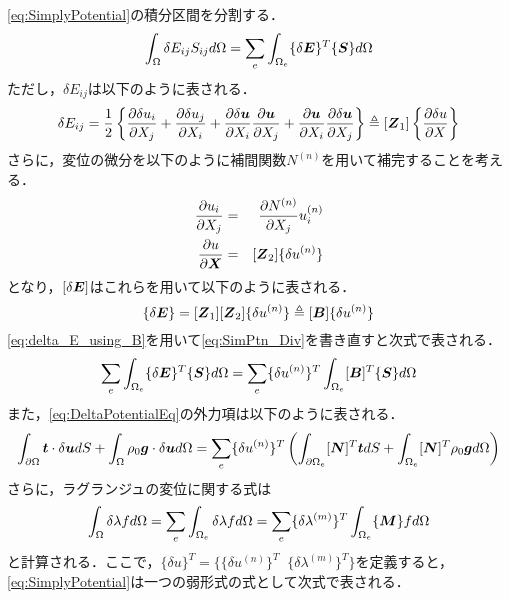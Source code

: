\eqref{eq:SimplyPotential}の積分区間を分割する．
\begin{equation}\label{eq:SimPtn_Div}
	\int_{\Omega} \delta E_{ij} S_{ij} d\Omega = \sum_{e} \int_{\Omega_e} \{\delta {\mbox{\boldmath $E$}} \}^T \{{\mbox{\boldmath $S$}} \} d\Omega 
\end{equation}
ただし，$ \delta E_{ij} $は以下のように表される．
\begin{equation}\label{eq:DeltaEeq}
	\delta E_{ij} = \frac{1}{2} \left\{ \frac{\partial \delta u_i}{\partial X_j} + \frac{\partial \delta u_j}{\partial X_i} + \frac{\partial \delta {\mbox{\boldmath $u$}}}{\partial X_i} \frac{\partial {\mbox{\boldmath $u$}}}{\partial X_j} + \frac{\partial {\mbox{\boldmath $u$}}}{\partial X_i} \frac{\partial \delta {\mbox{\boldmath $u$}}}{\partial X_j} \right\} \triangleq [{\mbox{\boldmath $Z$}}_1]\left\{ \frac{\partial \delta u}{\partial X}\right\}
\end{equation}
さらに，変位の微分を以下のように補間関数$ N^{(n)} $を用いて補完することを考える．
\begin{eqnarray}\label{eq:InterpolateU}
	\frac{\partial u_i}{\partial X_j} &=& \frac{\partial N^{(n)}}{\partial X_j} u_i^{(n)} \\
	\frac{\partial u}{\partial {\mbox{\boldmath $X$}}} &=& [{\mbox{\boldmath $Z$}}_2]\{ \delta u^{(n)} \}
\end{eqnarray}
となり，$ [\delta {\mbox{\boldmath $E$}}] $はこれらを用いて以下のように表される．
\begin{equation}\label{eq:delta_E_using_B}
	\{\delta {\mbox{\boldmath $E$}} \} = [{\mbox{\boldmath $Z$}}_1] [{\mbox{\boldmath $Z$}}_2]\{ \delta u^{(n)} \} \triangleq [{\mbox{\boldmath $B$}}] \{ \delta u^{(n)} \}
\end{equation}
\eqref{eq:delta_E_using_B}を用いて\eqref{eq:SimPtn_Div}を書き直すと次式で表される．
\begin{equation}\label{eq:SimPtn_Div}
 \sum_{e} \int_{\Omega_e} \{\delta {\mbox{\boldmath $E$}} \}^T \{{\mbox{\boldmath $S$}} \} d\Omega =  \sum_{e} \{ \delta u^{(n)} \}^T \int_{\Omega_e} [{\mbox{\boldmath $B$}}]^T \{{\mbox{\boldmath $S$}} \} d\Omega
\end{equation}
また，\eqref{eq:DeltaPotentialEq}の外力項は以下のように表される．
\begin{equation}\label{eq:ExWorkEq}
	 \int_{\partial \Omega} {\mbox{\boldmath $t$}} \cdot \delta {\mbox{\boldmath $u$}} dS + \int_{\Omega} \rho_0{\mbox{\boldmath $g$}} \cdot \delta {\mbox{\boldmath $u$}} d\Omega = \sum_{e} \{ \delta u^{(n)} \}^T \left(\int_{\partial \Omega_e} [{\mbox{\boldmath $N$}}]^T {\mbox{\boldmath $t$}} dS + \int_{\Omega_e}[{\mbox{\boldmath $N$}}]^T \rho_0 {\mbox{\boldmath $g$}} d\Omega\right)
\end{equation}
さらに，ラグランジュの変位に関する式は
\begin{equation}\label{eq:ConstDelLagEq}
	\int_{\Omega} \delta \lambda f d\Omega = \sum_{e} \int_{\Omega_e} \delta \lambda f d\Omega =  \sum_{e} \{ \delta \lambda^{(m)} \}^T \int_{\Omega_e} \{ {\mbox{\boldmath $M$}} \} f d\Omega
\end{equation}
と計算される．ここで，$ \{ \delta u \}^T =\{\{ \delta u^{(n)} \}^T \;\; \{ \delta \lambda^{(m)} \}^T\} $を定義すると，\eqref{eq:SimplyPotential}は一つの弱形式の式として次式で表される．

